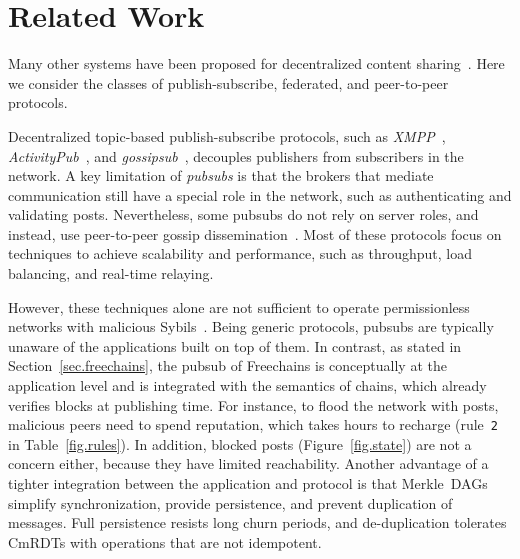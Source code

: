 \documentclass[12pt]{article}
\newcommand{\FC}       {Freechains\xspace}
\newcommand{\code}[1]  {\texttt{\footnotesize{#1}}}
\begin{document}
\section{Related Work}
\label{sec.related}

Many other systems have been proposed for decentralized content
sharing~\cite{p2p.survey,p2p.ecosystem}.
Here we consider the classes of publish-subscribe, federated, and peer-to-peer
protocols.


Decentralized topic-based publish-subscribe protocols, such as
    \emph{XMPP}~\cite{pubsub.xmpp},
    \emph{ActivityPub}~\cite{pubsub.activitypub}, and
    \emph{gossipsub}~\cite{pubsub.gossipsub},
decouples publishers from subscribers in the network.
%
A key limitation of \emph{pubsubs} is that the brokers that mediate
communication still have a special role in the network, such as authenticating
and validating posts.
%
Nevertheless, some pubsubs do not rely on server roles, and instead, use
peer-to-peer gossip dissemination~\cite{pubsub.tera,pubsub.rappel,pubsub.stan,pubsub.vitis,pubsub.gossipsub,pubsub.rappel}.
Most of these protocols focus on techniques to achieve scalability and
performance, such as throughput, load balancing, and real-time relaying.

However, these techniques alone are not sufficient to operate permissionless
networks with malicious Sybils~\cite{pubsub.gossipsub2}.
Being generic protocols, pubsubs are typically unaware of the applications
built on top of them.
%
In contrast, as stated in Section~\ref{sec.freechains}, the pubsub of \FC is
conceptually at the application level and is integrated with the semantics of
chains, which already verifies blocks at publishing time.
For instance, to flood the network with posts, malicious peers need to spend
reputation, which takes hours to recharge (rule~\code{2} in
Table~\ref{fig.rules}).
In addition, blocked posts (Figure~\ref{fig.state}) are not a concern either,
because they have limited reachability.
Another advantage of a tighter integration between the application and protocol
is that Merkle~DAGs simplify synchronization, provide persistence, and prevent
duplication of messages.
Full persistence resists long churn periods, and de-duplication tolerates
CmRDTs with operations that are not idempotent.
\end{document}
